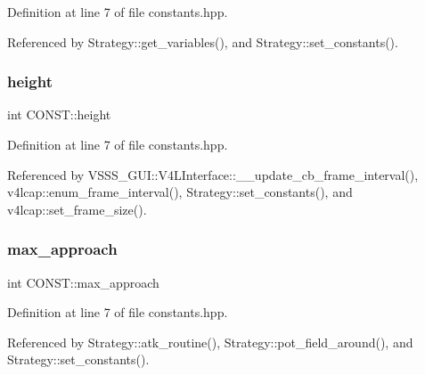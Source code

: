 Definition at line 7 of file constants.\+hpp.



Referenced by Strategy\+::get\+\_\+variables(), and Strategy\+::set\+\_\+constants().

\mbox{\label{namespace_c_o_n_s_t_a9805ca9eb67b8225c60697567283175d}} 
\subsubsection{\texorpdfstring{height}{height}}
{\footnotesize\ttfamily int C\+O\+N\+S\+T\+::height\hspace{0.3cm}{\ttfamily [static]}}



Definition at line 7 of file constants.\+hpp.



Referenced by V\+S\+S\+S\+\_\+\+G\+U\+I\+::\+V4\+L\+Interface\+::\+\_\+\+\_\+update\+\_\+cb\+\_\+frame\+\_\+interval(), v4lcap\+::enum\+\_\+frame\+\_\+interval(), Strategy\+::set\+\_\+constants(), and v4lcap\+::set\+\_\+frame\+\_\+size().

\mbox{\label{namespace_c_o_n_s_t_ae2d0cdffa1b71008198e4f7455a5d17e}} 
\subsubsection{\texorpdfstring{max\+\_\+approach}{max\_approach}}
{\footnotesize\ttfamily int C\+O\+N\+S\+T\+::max\+\_\+approach\hspace{0.3cm}{\ttfamily [static]}}



Definition at line 7 of file constants.\+hpp.



Referenced by Strategy\+::atk\+\_\+routine(), Strategy\+::pot\+\_\+field\+\_\+around(), and Strategy\+::set\+\_\+constants().

\mbox{\label{namespace_c_o_n_s_t_ac842498e6a58e8876f03a854fc407ca4}} 
